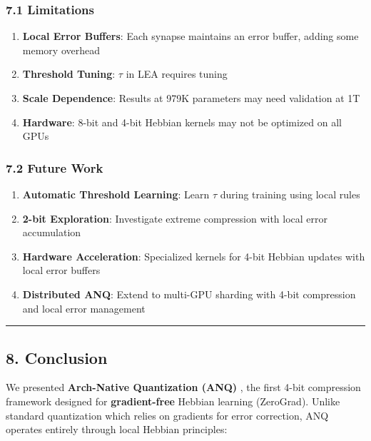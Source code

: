 \documentclass[
  11pt,
  a4paper,
]{article}
\providecommand{\tightlist}{%
  \setlength{\itemsep}{0pt}\setlength{\parskip}{0pt}}
\begin{document}
\subsubsection{7.1 Limitations}\label{limitations}

\begin{enumerate}
\def\labelenumi{\arabic{enumi}.}
\tightlist
\item
  \textbf{Local Error Buffers}: Each synapse maintains an error buffer,
  adding some memory overhead
\item
  \textbf{Threshold Tuning}: \(\tau\) in LEA requires tuning
\item
  \textbf{Scale Dependence}: Results at 979K parameters may need
  validation at 1T
\item
  \textbf{Hardware}: 8-bit and 4-bit Hebbian kernels may not be
  optimized on all GPUs
\end{enumerate}

\subsubsection{7.2 Future Work}\label{future-work}

\begin{enumerate}
\def\labelenumi{\arabic{enumi}.}
\tightlist
\item
  \textbf{Automatic Threshold Learning}: Learn \(\tau\) during training
  using local rules
\item
  \textbf{2-bit Exploration}: Investigate extreme compression with local
  error accumulation
\item
  \textbf{Hardware Acceleration}: Specialized kernels for 4-bit Hebbian
  updates with local error buffers
\item
  \textbf{Distributed ANQ}: Extend to multi-GPU sharding with 4-bit
  compression and local error management
\end{enumerate}

\begin{center}\rule{0.5\linewidth}{0.5pt}\end{center}

\subsection{8. Conclusion}\label{conclusion}

We presented \textbf{Arch-Native Quantization (ANQ)} , the first 4-bit
compression framework designed for \textbf{gradient-free} Hebbian
learning (ZeroGrad). Unlike standard quantization which relies on
gradients for error correction, ANQ operates entirely through local
Hebbian principles:
\end{document}
